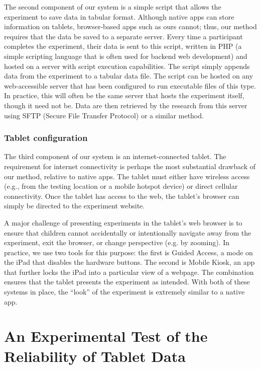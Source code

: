 \documentclass[man,noapacite]{apa2}
\begin{document}
The second component of our system is a simple script that allows the experiment to save data in tabular format. Although native apps can store information on tablets, browser-based apps such as ours cannot; thus, our method requires that the data be saved to a separate server. Every time a participant completes the experiment, their data is sent to this script, written in PHP (a simple scripting language that is often used for backend web development) and hosted on a server with script execution capabilities. The script simply appends data from the experiment to a tabular data file. The script can be hosted on any web-accessible server that has been configured to run executable files of this type. In practice, this will often be the same server that hosts the experiment itself, though it need not be. Data are then retrieved by the research from this server using SFTP (Secure File Transfer Protocol) or a similar method. 

\subsubsection{Tablet configuration}

The third component of our system is an internet-connected tablet. The requirement for internet connectivity is perhaps the most substantial drawback of our method, relative to native apps. The tablet must either have wireless access (e.g., from the testing location or a mobile hotspot device) or direct cellular connectivity. Once the tablet has access to the web, the tablet's browser can simply be directed to the experiment website. 

A major challenge of presenting experiments in the tablet's web browser is to ensure that children cannot accidentally or intentionally navigate away from the experiment, exit the browser, or change perspective (e.g. by zooming). In practice, we use two tools for this purpose: the first is Guided Access, a mode on the iPad that disables the hardware buttons. The second is Mobile Kiosk, an app that further locks the iPad into a particular view of a webpage. The combination ensures that the tablet presents the experiment as intended. With both of these systems in place, the ``look'' of the experiment is extremely similar to a native app. 

\section{An Experimental Test of the Reliability of Tablet Data}
 
\end{document}
